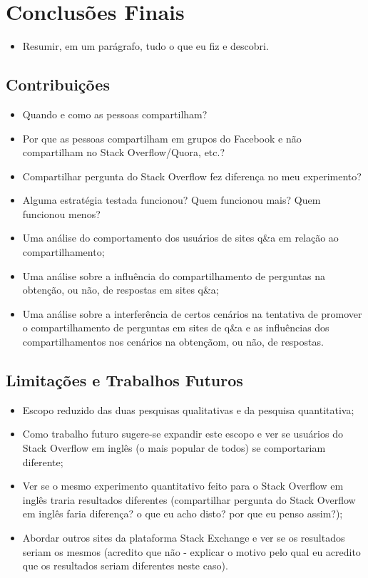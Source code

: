 \chapter{Conclusões Finais}
\begin{itemize}
    \item Resumir, em um parágrafo, tudo o que eu fiz e descobri.
\end{itemize}

\section{Contribuições}
\begin{itemize}
\item Quando e como as pessoas compartilham?
\item Por que as pessoas compartilham em grupos do Facebook e não compartilham no Stack Overflow/Quora, etc.? 
\item Compartilhar pergunta do Stack Overflow fez diferença no meu experimento?
\item Alguma estratégia testada funcionou? Quem funcionou mais? Quem funcionou menos?
\item Uma análise do comportamento dos usuários de sites q\&a em relação ao compartilhamento;
\item Uma análise sobre a influência do compartilhamento de perguntas na obtenção, ou não, de respostas em sites q\&a;
\item Uma análise sobre a interferência de certos cenários na tentativa de promover o compartilhamento de perguntas em sites de q\&a e as influências dos compartilhamentos nos cenários na obtençãom, ou não, de respostas.
\end{itemize}

\section{Limitações e Trabalhos Futuros}
\begin{itemize}
\item Escopo reduzido das duas pesquisas qualitativas e da pesquisa quantitativa;
\item Como trabalho futuro sugere-se expandir este escopo e ver se usuários do Stack Overflow em inglês (o mais popular de todos) se comportariam diferente;
\item Ver se o mesmo experimento quantitativo feito para o Stack Overflow em inglês traria resultados diferentes (compartilhar pergunta do Stack Overflow em inglês faria diferença? o que eu acho disto? por que eu penso assim?);
\item Abordar outros sites da plataforma Stack Exchange e ver se os resultados seriam os mesmos (acredito que não - explicar o motivo pelo qual eu acredito que os resultados seriam diferentes neste caso).
\end{itemize}